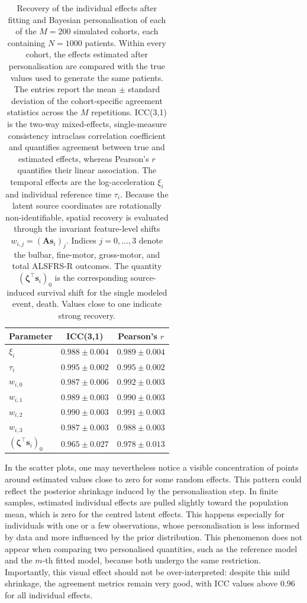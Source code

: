 \documentclass{rapportCS}
\begin{document}
\begin{table}[H]
\centering
\begin{tabular}{lcc}
\hline
\textbf{Parameter} & \textbf{ICC(3,1)} & \textbf{Pearson's $r$} \\ \hline
$\xi_i$ & $0.988 \pm 0.004$ & $0.989 \pm 0.004$ \\
$\tau_i$ & $0.995 \pm 0.002$ & $0.995 \pm 0.002$ \\
$w_{i,0}$ & $0.987 \pm 0.006$ & $0.992 \pm 0.003$ \\
$w_{i,1}$ & $0.989 \pm 0.003$ & $0.990 \pm 0.003$ \\
$w_{i,2}$ & $0.990 \pm 0.003$ & $0.991 \pm 0.003$ \\
$w_{i,3}$ & $0.987 \pm 0.003$ & $0.988 \pm 0.003$ \\
$(\boldsymbol{\zeta}^\top \mathbf{s}_i)_0$ & $0.965 \pm 0.027$ & $0.978 \pm 0.013$ \\
\hline
\end{tabular}
\caption{Recovery of the individual effects after fitting and Bayesian personalisation of each of the $M=200$ simulated cohorts, each containing $N=1000$ patients. Within every cohort, the effects estimated after personalisation are compared with the true values used to generate the same patients. The entries report the mean $\pm$ standard deviation of the cohort-specific agreement statistics across the $M$ repetitions. ICC(3,1) is the two-way mixed-effects, single-measure consistency intraclass correlation coefficient and quantifies agreement between true and estimated effects, whereas Pearson's $r$ quantifies their linear association. The temporal effects are the log-acceleration $\xi_i$ and individual reference time $\tau_i$. Because the latent source coordinates are rotationally non-identifiable, spatial recovery is evaluated through the invariant feature-level shifts $w_{i,j}=(\mathbf{A}\mathbf{s}_i)_j$. Indices $j=0,\ldots,3$ denote the bulbar, fine-motor, gross-motor, and total ALSFRS-R outcomes. The quantity $(\boldsymbol{\zeta}^{\top}\mathbf{s}_i)_0$ is the corresponding source-induced survival shift for the single modeled event, death. Values close to one indicate strong recovery.}
\label{tab:metrics}
\end{table}

In the scatter plots, one may nevertheless notice a visible concentration of points around estimated values close to zero for some random effects. This pattern could reflect the posterior shrinkage induced by the personalisation step. In finite samples, estimated individual effects are pulled slightly toward the population mean, which is zero for the centred latent effects. This happens especially for individuals with one or a few observations, whose personalisation is less informed by data and more influenced by the prior distribution. This phenomenon does not appear when comparing two personalised quantities, such as the reference model and the $m$-th fitted model, because both undergo the same restriction. Importantly, this visual effect should not be over-interpreted: despite this mild shrinkage, the agreement metrics remain very good, with ICC values above $0.96$ for all individual effects.
\end{document}
